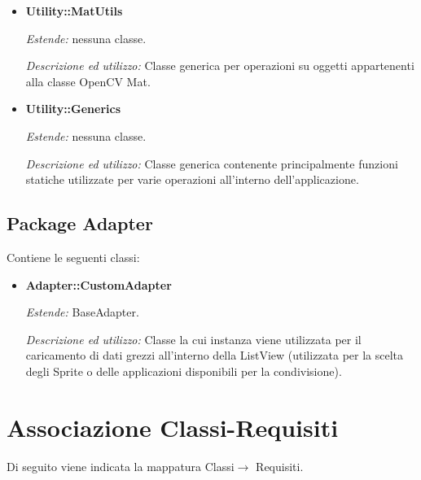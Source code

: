 \begin{itemize}

\item \textbf{Utility::MatUtils}

\textit{Estende:} nessuna classe.

\textit{Descrizione ed utilizzo:} Classe generica per operazioni su oggetti appartenenti alla classe OpenCV Mat.

\item \textbf{Utility::Generics}

\textit{Estende:} nessuna classe.

\textit{Descrizione ed utilizzo:} Classe generica contenente principalmente funzioni statiche utilizzate per varie operazioni all'interno dell'applicazione.
\end{itemize}


\subsection{Package Adapter}
Contiene le seguenti classi:

\begin{itemize}

\item \textbf{Adapter::CustomAdapter}

\textit{Estende:} BaseAdapter.

\textit{Descrizione ed utilizzo:} Classe la cui instanza viene utilizzata per il caricamento di dati grezzi all'interno della ListView (utilizzata per la scelta degli Sprite o delle applicazioni disponibili per la condivisione).

\end{itemize}

\newpage

\section{Associazione Classi-Requisiti}

Di seguito viene indicata la mappatura Classi$\rightarrow$ Requisiti.

